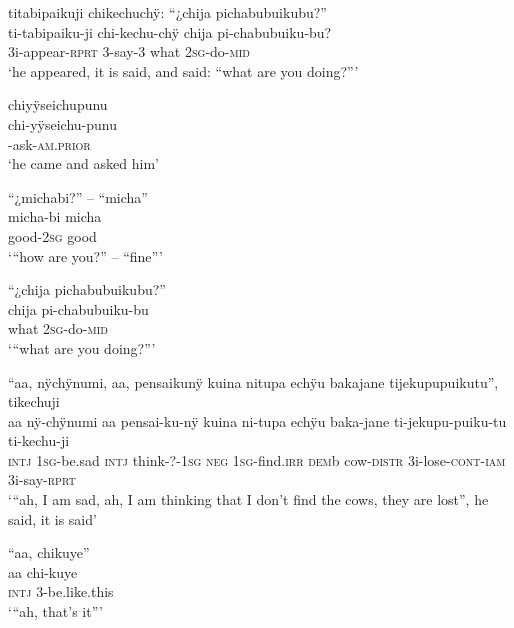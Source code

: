 \ea%
\begingl 
\glpreamble titabipaikuji chikechuchÿ: “¿chija pichabubuikubu?”\\
\gla ti-tabipaiku-ji chi-kechu-chÿ chija pi-chabubuiku-bu? \\ 
\glb 3i-appear-\textsc{rprt} 3-say-3 what 2\textsc{sg}-do-\textsc{mid}\\ 
\glft ‘he appeared, it is said, and said: “what are you doing?”’\\ 
\endgl
\xe

\ea%
\begingl 
\glpreamble chiyÿseichupunu\\
\gla chi-yÿseichu-punu\\ 
-ask-\textsc{am.prior}\\ 
\glft ‘he came and asked him’\\ 
\endgl
\xe

\ea%
\begingl 
\glpreamble “¿michabi?” – “micha”\\
\gla micha-bi micha\\ 
\glb good-2\textsc{sg} good\\ 
\glft ‘“how are you?” – “fine”’\\ 
\endgl
\xe


\ea%
\begingl 
\glpreamble “¿chija pichabubuikubu?”\\
\gla  chija pi-chabubuiku-bu\\ 
\glb  what 2\textsc{sg}-do-\textsc{mid}\\ 
\glft ‘“what are you doing?”’\\ 
\endgl
\xe

\ea%
\begingl 
\glpreamble “aa, nÿchÿnumi, aa, pensaikunÿ kuina nitupa echÿu bakajane tijekupupuikutu”, tikechuji\\
\gla aa nÿ-chÿnumi aa pensai-ku-nÿ kuina ni-tupa echÿu baka-jane ti-jekupu-puiku-tu ti-kechu-ji\\ 
\glb \textsc{intj} 1\textsc{sg}-be.sad \textsc{intj} think-?-1\textsc{sg} \textsc{neg} 1\textsc{sg}-find.\textsc{irr} \textsc{dem}b cow-\textsc{distr} 3i-lose-\textsc{cont}-\textsc{iam} 3i-say-\textsc{rprt}\\ 
\glft ‘“ah, I am sad, ah, I am thinking that I don’t find the cows, they are lost”, he said, it is said’\\ 
\endgl
\xe

\ea%
\begingl 
\glpreamble “aa, chikuye”\\
\gla aa chi-kuye\\ 
\glb \textsc{intj} 3-be.like.this\\ 
\glft ‘“ah, that’s it”’\\ 
\endgl
\xe

